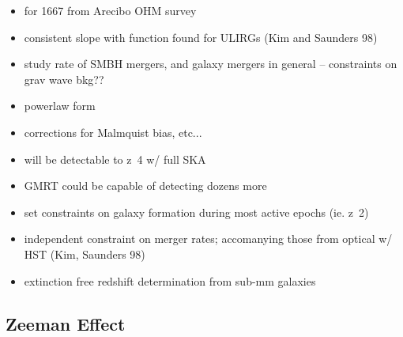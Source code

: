 \begin{itemize}
\item for 1667 from Arecibo OHM survey
\item consistent slope with function found for ULIRGs (Kim and Saunders 98)
\item study rate of SMBH mergers, and galaxy mergers in general -- constraints on grav wave bkg??
\item powerlaw form
\item corrections for Malmquist bias, etc...
\item will be detectable to z~4 w/ full SKA
\item GMRT could be capable of detecting dozens more
\item set constraints on galaxy formation during most active epochs (ie. z~2)
\item independent constraint on merger rates; accomanying those from optical w/ HST (Kim, Saunders 98)
\item extinction free redshift determination from sub-mm galaxies
\end{itemize}

\subsection{Zeeman Effect}

